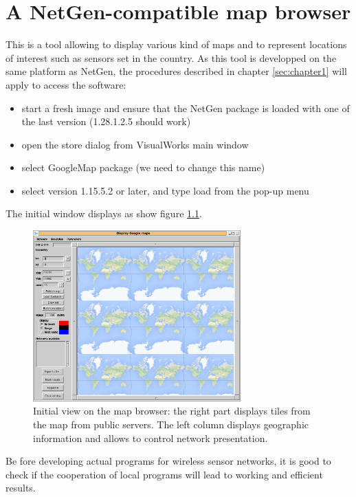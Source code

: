 
\chapter{A NetGen-compatible map browser}

This is a tool allowing to display various kind of maps and to represent 
locations of interest such as sensors set in the country. 
As this tool is developped on the same platform as NetGen, the procedures described 
in chapter \ref{sec:chapter1} will apply to access the software: 
\begin{itemize}
\item start a fresh image and ensure that the NetGen package is loaded with one of the last 
version (1.28.1.2.5 should work)
\item open the store dialog from VisualWorks main window
\item select GoogleMap package (we need to change this name)
\item select version 1.15.5.2 or later, and type load from the pop-up menu
\end{itemize}

The initial window displays as show figure \ref{fig:initialGmap}. 

\begin{figure}
\begin{center} 
\includegraphics[width=8cm]{gmap.png}
\caption{Initial view on the map browser: the right part displays tiles from the map 
from public servers. The left column displays geographic information and allows 
to control network presentation. }
\label{fig:initialGmap}
\end{center}
\end{figure}


Be fore developing actual programs for wireless sensor networks, it
is good to check if the cooperation of local programs will lead
to working and efficient results.

